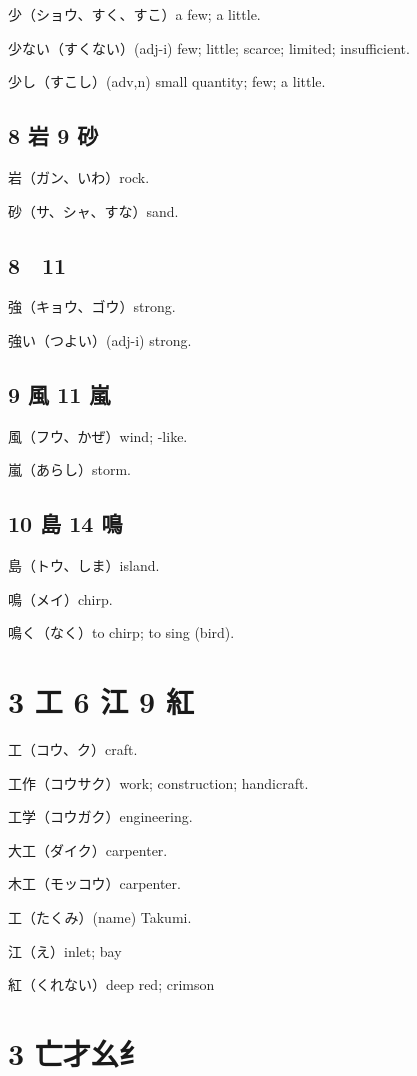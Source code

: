 少（ショウ、すく、すこ）a few; a little.

少ない（すくない）(adj-i) few; little; scarce; limited; insufficient.

少し（すこし）(adv,n) small quantity; few; a little.

\subsection{8 岩 9 砂}

岩（ガン、いわ）rock.

砂（サ、シャ、すな）sand.

\subsection{8 𧈧 11 強}

強（キョウ、ゴウ）strong.

強い（つよい）(adj-i) strong.

\subsection{9 風 11 嵐}

風（フウ、かぜ）wind; -like.

嵐（あらし）storm.

\subsection{10 島 14 鳴}

島（トウ、しま）island.

鳴（メイ）chirp.

鳴く（なく）to chirp; to sing (bird).

\section{3 工 6 江 9 紅}

工（コウ、ク）craft.

工作（コウサク）work; construction; handicraft.

工学（コウガク）engineering.

大工（ダイク）carpenter.

木工（モッコウ）carpenter.

工（たくみ）(name) Takumi.

江（え）inlet; bay

紅（くれない）deep red; crimson

\section{3 亡才幺纟}

